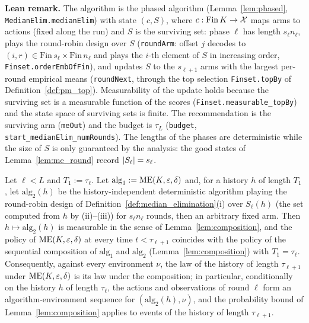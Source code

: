 \textbf{Lean remark.} The algorithm is the phased algorithm (Lemma~\ref{lem:phased},
\texttt{MedianElim.medianElim}) with state $(c, S)$, where $c : \mathrm{Fin}\,K \to \mathcal{X}$ maps
arms to actions (fixed along the run) and $S$ is the surviving set: phase $\ell$ has length
$s_\ell n_\ell$, plays the round-robin design over $S$ (\texttt{roundArm}: offset $j$ decodes to
$(i, r) \in \mathrm{Fin}\,s_\ell \times \mathrm{Fin}\,n_\ell$ and plays the $i$-th element of
$S$ in increasing order, \texttt{Finset.orderEmbOfFin}), and updates $S$ to the $s_{\ell+1}$ arms
with the largest per-round empirical means (\texttt{roundNext}, through the top selection
\texttt{Finset.topBy} of Definition~\ref{def:pm_top}). Measurability of the update holds because
the surviving set is a measurable function of the scores (\texttt{Finset.measurable\_topBy}) and
the state space of surviving sets is finite. The recommendation is the surviving arm
(\texttt{meOut}) and the budget is $\tau_L$ (\texttt{budget}, \texttt{start\_medianElim\_numRounds}).
The lengths of the phases are deterministic while the size of $S$ is only guaranteed by the
analysis: the good states of Lemma~\ref{lem:me_round} record $\lvert S_\ell \rvert = s_\ell$.

\begin{lemma}
\label{lem:pm_policy_composition}
\leanok
{}
Let $\ell<L$ and $T_1 := \tau_\ell$. Let $\mathrm{alg}_1 := \mathrm{ME}(K,\varepsilon,\delta)$ and, for a
history $h$ of length $T_1$, let $\mathrm{alg}_2(h)$ be the history-independent deterministic
algorithm playing the round-robin design of Definition~\ref{def:median_elimination}(i) over
$S_\ell(h)$ (the set computed from $h$ by (ii)--(iii)) for $s_\ell n_\ell$ rounds, then an
arbitrary fixed arm. Then $h\mapsto\mathrm{alg}_2(h)$ is measurable in the sense of
Lemma~\ref{lem:composition}, and the policy of $\mathrm{ME}(K,\varepsilon,\delta)$ at every time
$t<\tau_{\ell+1}$ coincides with the policy of the sequential composition of $\mathrm{alg}_1$ and
$\mathrm{alg}_2$ (Lemma~\ref{lem:composition}) with $T_1 = \tau_\ell$. Consequently, against
every environment $\nu$, the law of the history of length $\tau_{\ell+1}$ under
$\mathrm{ME}(K,\varepsilon,\delta)$ is its law under the composition; in particular, conditionally
on the history $h$ of length $\tau_\ell$, the actions and observations of round $\ell$ form an
algorithm-environment sequence for $(\mathrm{alg}_2(h),\nu)$, and the probability bound of
Lemma~\ref{lem:composition} applies to events of the history of length $\tau_{\ell+1}$.
\end{lemma}

